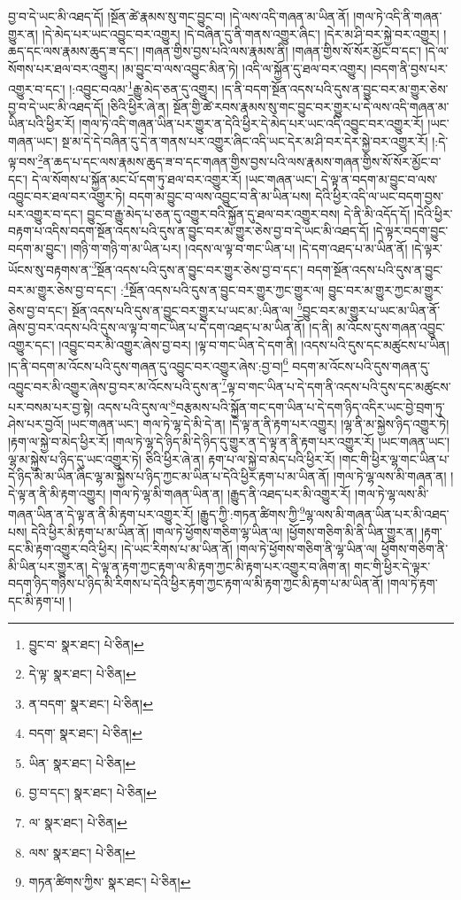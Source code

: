 བྱ་བ་དེ་ཡང་མི་འཐད་དོ། །སྔོན་ཚེ་རྣམས་སུ་གང་བྱུང་བ། །དེ་ལས་འདི་གཞན་མ་ཡིན་ནོ། །གལ་ཏེ་འདི་ནི་གཞན་གྱུར་ན། །དེ་མེད་པར་ཡང་འབྱུང་བར་འགྱུར། །དེ་བཞིན་དུ་ནི་གནས་འགྱུར་ཞིང་། །དེར་མ་ཤི་བར་སྐྱེ་བར་འགྱུར། །ཆད་དང་ལས་རྣམས་ཆུད་ཟ་དང་། །གཞན་གྱིས་བྱས་པའི་ལས་རྣམས་ནི། །གཞན་གྱིས་སོ་སོར་མྱོང་བ་དང་། །དེ་ལ་སོགས་པར་ཐལ་བར་འགྱུར། །མ་བྱུང་བ་ལས་འབྱུང་མིན་ཏེ། །འདི་ལ་སྐྱོན་དུ་ཐལ་བར་འགྱུར། །བདག་ནི་བྱས་པར་འགྱུར་བ་དང་། །:འབྱུང་བའམ་\footnote{བྱུང་བ་  སྣར་ཐང་།  པེ་ཅིན། }རྒྱུ་མེད་ཅན་དུ་འགྱུར། །ད་ནི་བདག་སྔོན་འདས་པའི་དུས་ན་བྱུང་བར་མ་གྱུར་ཅེས་བྱ་བ་དེ་ཡང་མི་འཐད་དོ། །ཅིའི་ཕྱིར་ཞེ་ན། སྔོན་གྱི་ཚེ་རབས་རྣམས་སུ་གང་བྱུང་བར་གྱུར་པ་དེ་ལས་འདི་གཞན་མ་ཡིན་པའི་ཕྱིར་རོ། །གལ་ཏེ་འདི་གཞན་ཡིན་པར་གྱུར་ན་དེའི་ཕྱིར་དེ་མེད་པར་ཡང་འདི་འབྱུང་བར་འགྱུར་རོ། །ཡང་གཞན་ཡང་། སྔ་མ་དེ་དེ་བཞིན་དུ་དེ་ན་གནས་པར་འགྱུར་ཞིང་འདི་ཡང་དེར་མ་ཤི་བར་དེར་སྐྱེ་བར་འགྱུར་རོ། །:དེ་ལྟ་བས་\footnote{དེ་ལྟ་  སྣར་ཐང་།  པེ་ཅིན། }ན་ཆད་པ་དང་ལས་རྣམས་ཆུད་ཟ་བ་དང་གཞན་གྱིས་བྱས་པའི་ལས་རྣམས་གཞན་གྱིས་སོ་སོར་མྱོང་བ་དང་། དེ་ལ་སོགས་པ་སྐྱོན་མང་པོ་དག་ཏུ་ཐལ་བར་འགྱུར་རོ། །ཡང་གཞན་ཡང་། དེ་ལྟ་ན་བདག་མ་བྱུང་བ་ལས་འབྱུང་བར་ཐལ་བར་འགྱུར་ཏེ། བདག་མ་བྱུང་བ་ལས་འབྱུང་བ་ནི་མ་ཡིན་པས། དེའི་ཕྱིར་འདི་ལ་ཡང་བདག་བྱས་པར་འགྱུར་བ་དང་། བྱུང་བ་རྒྱུ་མེད་པ་ཅན་དུ་འགྱུར་བའི་སྐྱོན་དུ་ཐལ་བར་འགྱུར་བས། དེ་ནི་མི་འདོད་དོ། །དེའི་ཕྱིར་བརྟག་པ་འདིས་བདག་སྔོན་འདས་པའི་དུས་ན་བྱུང་བར་མ་གྱུར་ཅེས་བྱ་བ་དེ་ཡང་མི་འཐད་དོ། །དེ་ལྟར་བདག་བྱུང་བདག་མ་བྱུང་། །གཉི་ག་གཉི་ག་མ་ཡིན་པར། །འདས་ལ་ལྟ་བ་གང་ཡིན་པ། །དེ་དག་འཐད་པ་མ་ཡིན་ནོ། །དེ་ལྟར་ཡོངས་སུ་བརྟགས་ན་\footnote{ན་བདག་  སྣར་ཐང་།  པེ་ཅིན། }སྔོན་འདས་པའི་དུས་ན་བྱུང་བར་གྱུར་ཅེས་བྱ་བ་དང་། བདག་སྔོན་འདས་པའི་དུས་ན་བྱུང་བར་མ་གྱུར་ཅེས་བྱ་བ་དང་། :\footnote{བདག་  སྣར་ཐང་།  པེ་ཅིན། }སྔོན་འདས་པའི་དུས་ན་བྱུང་བར་གྱུར་ཀྱང་གྱུར་ལ། བྱུང་བར་མ་གྱུར་ཀྱང་མ་གྱུར་ཅེས་བྱ་བ་དང་། སྔོན་འདས་པའི་དུས་ན་བྱུང་བར་གྱུར་པ་ཡང་མ་:ཡིན་ལ། \footnote{ཡིན་  སྣར་ཐང་།  པེ་ཅིན། }བྱུང་བར་མ་གྱུར་པ་ཡང་མ་ཡིན་ནོ་ཞེས་བྱ་བར་འདས་པའི་དུས་ལ་ལྟ་བ་གང་ཡིན་པ་དེ་དག་འཐད་པ་མ་ཡིན་ནོ། །ད་ནི། མ་འོངས་དུས་གཞན་འབྱུང་འགྱུར་དང་། །འབྱུང་བར་མི་འགྱུར་ཞེས་བྱ་བར། །ལྟ་བ་གང་ཡིན་དེ་དག་ནི། །འདས་པའི་དུས་དང་མཚུངས་པ་ཡིན། །ད་ནི་བདག་མ་འོངས་པའི་དུས་གཞན་དུ་འབྱུང་བར་འགྱུར་ཞེས་:བྱ་བ།\footnote{བྱ་བ་དང་།  སྣར་ཐང་།  པེ་ཅིན། } བདག་མ་འོངས་པའི་དུས་གཞན་དུ་འབྱུང་བར་མི་འགྱུར་ཞེས་བྱ་བར་མ་འོངས་པའི་དུས་ན་\footnote{ལ་  སྣར་ཐང་།  པེ་ཅིན། }ལྟ་བ་གང་ཡིན་པ་དེ་དག་ནི་འདས་པའི་དུས་དང་མཚུངས་པར་བསམ་པར་བྱ་སྟེ། འདས་པའི་དུས་ལ་\footnote{ལས་  སྣར་ཐང་།  པེ་ཅིན། }བརྩམས་པའི་སྐྱོན་གང་དག་ཡིན་པ་དེ་དག་ཉིད་འདིར་ཡང་བྱེ་བྲག་ཏུ་ཤེས་པར་བྱའོ། །ཡང་གཞན་ཡང་། གལ་ཏེ་ལྷ་དེ་མི་དེ་ན། །དེ་ལྟ་ན་ནི་རྟག་པར་འགྱུར། །ལྷ་ནི་མ་སྐྱེས་ཉིད་འགྱུར་ཏེ། །རྟག་ལ་སྐྱེ་བ་མེད་ཕྱིར་རོ། །གལ་ཏེ་ལྷ་དེ་ཉིད་མི་དེ་ཉིད་དུ་གྱུར་ན་དེ་ལྟ་ན་ནི་རྟག་པར་འགྱུར་རོ། །ཡང་གཞན་ཡང་། ལྷ་མ་སྐྱེས་པ་ཉིད་དུ་ཡང་འགྱུར་ཏེ། ཅིའི་ཕྱིར་ཞེ་ན། རྟག་པ་ལ་སྐྱེ་བ་མེད་པའི་ཕྱིར་རོ། །གང་གི་ཕྱིར་ལྷ་གང་ཡིན་པ་དེ་ཉིད་མི་མ་ཡིན་ཞིང་ལྷ་མ་སྐྱེས་པ་ཉིད་ཀྱང་མ་ཡིན་པ་དེའི་ཕྱིར་རྟག་པ་མ་ཡིན་ནོ། །གལ་ཏེ་ལྷ་ལས་མི་གཞན་ན། །དེ་ལྟ་ན་ནི་མི་རྟག་འགྱུར། །གལ་ཏེ་ལྷ་མི་གཞན་ཡིན་ན། །རྒྱུད་ནི་འཐད་པར་མི་འགྱུར་རོ། །གལ་ཏེ་ལྷ་ལས་མི་གཞན་ཡིན་ན་དེ་ལྟ་ན་ནི་མི་རྟག་པར་འགྱུར་རོ། །རྒྱུད་ཀྱི་:གཏན་ཚིགས་ཀྱི་\footnote{གཏན་ཚིགས་ཀྱིས་  སྣར་ཐང་།  པེ་ཅིན། }ལྷ་ལས་མི་གཞན་ཡིན་པར་མི་འཐད་པས། དེའི་ཕྱིར་མི་རྟག་པ་མ་ཡིན་ནོ། །གལ་ཏེ་ཕྱོགས་གཅིག་ལྷ་ཡིན་ལ། །ཕྱོགས་གཅིག་མི་ནི་ཡིན་གྱུར་ན། །རྟག་དང་མི་རྟག་འགྱུར་བའི་ཕྱིར། །དེ་ཡང་རིགས་པ་མ་ཡིན་ནོ། །གལ་ཏེ་ཕྱོགས་གཅིག་ནི་ལྷ་ཡིན་ལ། ཕྱོགས་གཅིག་ནི་མི་ཡིན་པར་གྱུར་ན། དེ་ལྟ་ན་རྟག་ཀྱང་རྟག་ལ་མི་རྟག་ཀྱང་མི་རྟག་པར་འགྱུར་བ་ཞིག་ན། གང་གི་ཕྱིར་དེ་ལྟར་བདག་ཉིད་གཉིས་པ་ཉིད་མི་རིགས་པ་དེའི་ཕྱིར་རྟག་ཀྱང་རྟག་ལ་མི་རྟག་ཀྱང་མི་རྟག་པ་མ་ཡིན་ནོ། །གལ་ཏེ་རྟག་དང་མི་རྟག་པ། །
